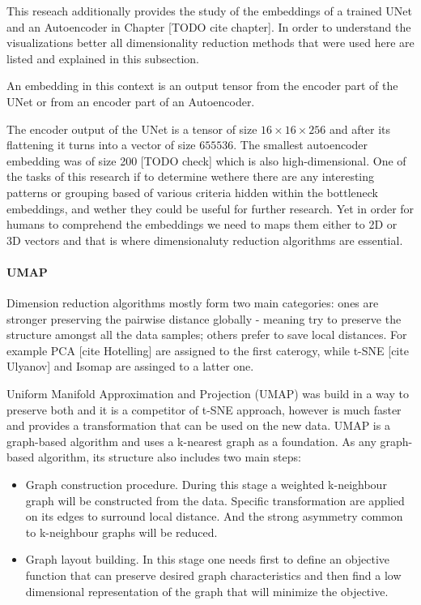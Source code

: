 This reseach additionally provides the study of the embeddings of a trained UNet and an Autoencoder in Chapter [TODO cite chapter]. In order to understand the visualizations better all dimensionality reduction methods that were used here are listed and explained in this subsection.

\begin{definition}[Embedding]
    An embedding in this context is an output tensor from the encoder part of the UNet or from an encoder part of an Autoencoder.
\end{definition}

The encoder output of the UNet is a tensor of size $16 \times 16 \times 256$ and after its flattening it turns into a vector of size $655536$. The smallest autoencoder embedding was of size 200 [TODO check] which is also high-dimensional. One of the tasks of this research if to determine wethere there are any interesting patterns or grouping based of various criteria hidden within the bottleneck embeddings, and wether they could be useful for further research. Yet in order for humans to comprehend the embeddings we need to maps them either to 2D or 3D vectors and that is where dimensionaluty reduction algorithms are essential.

\paragraph{UMAP}
Dimension reduction algorithms mostly form two main categories: ones are stronger preserving the pairwise
distance globally - meaning try to preserve the structure amongst all the data samples; others prefer to save local distances. For example PCA [cite Hotelling] are assigned to the first caterogy, while t-SNE [cite Ulyanov] and Isomap are assinged to a latter one.

Uniform Manifold Approximation and Projection (UMAP) was build in a way to preserve both and it is a competitor of t-SNE approach, however is much faster and provides a transformation that can be used on the new data. UMAP is a graph-based algorithm and uses a k-nearest graph as a foundation. As any graph-based algorithm, its structure also includes two main steps: 

\begin{itemize}
    \item Graph construction procedure. During this stage a weighted k-neighbour graph will be constructed from the data. Specific transformation are applied on its edges to surround local distance. And the strong asymmetry common to k-neighbour graphs will be reduced.
    \item Graph layout building. In this stage one needs first to define an objective function that can preserve desired graph characteristics and then find a low dimensional representation of the graph that will minimize the objective.
\end{itemize}

